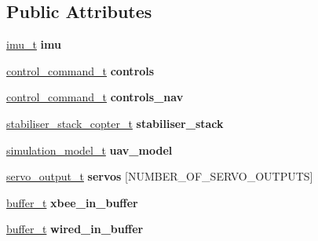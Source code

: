 \subsection*{Public Attributes}
\begin{DoxyCompactItemize}
\item 
\hypertarget{structcentral__data__t_a8092ee2d1d3c812ce85237b29b3e1ffb}{\hyperlink{structimu__t}{imu\+\_\+t} {\bfseries imu}}\label{structcentral__data__t_a8092ee2d1d3c812ce85237b29b3e1ffb}

\item 
\hypertarget{structcentral__data__t_af5e0de4d71e0eb085be0ca35bcb6cd79}{\hyperlink{structcontrol__command__t}{control\+\_\+command\+\_\+t} {\bfseries controls}}\label{structcentral__data__t_af5e0de4d71e0eb085be0ca35bcb6cd79}

\item 
\hypertarget{structcentral__data__t_a87ea6af954a693dd37b6a5c1c50fe762}{\hyperlink{structcontrol__command__t}{control\+\_\+command\+\_\+t} {\bfseries controls\+\_\+nav}}\label{structcentral__data__t_a87ea6af954a693dd37b6a5c1c50fe762}

\item 
\hypertarget{structcentral__data__t_ae4a136cfa00ab1e44db7a3d20a6e0a97}{\hyperlink{structstabiliser__stack__copter__t}{stabiliser\+\_\+stack\+\_\+copter\+\_\+t} {\bfseries stabiliser\+\_\+stack}}\label{structcentral__data__t_ae4a136cfa00ab1e44db7a3d20a6e0a97}

\item 
\hypertarget{structcentral__data__t_ae9253f5ded97bb65cddebc7132bf91f7}{\hyperlink{structsimulation__model__t}{simulation\+\_\+model\+\_\+t} {\bfseries uav\+\_\+model}}\label{structcentral__data__t_ae9253f5ded97bb65cddebc7132bf91f7}

\item 
\hypertarget{structcentral__data__t_a97a4fdc634fbda94296793d50cf96519}{\hyperlink{structservo__output__t}{servo\+\_\+output\+\_\+t} {\bfseries servos} \mbox{[}N\+U\+M\+B\+E\+R\+\_\+\+O\+F\+\_\+\+S\+E\+R\+V\+O\+\_\+\+O\+U\+T\+P\+U\+T\+S\mbox{]}}\label{structcentral__data__t_a97a4fdc634fbda94296793d50cf96519}

\item 
\hypertarget{structcentral__data__t_ad813573894e1abe73e128a57d61305ff}{\hyperlink{structbuffer__t}{buffer\+\_\+t} {\bfseries xbee\+\_\+in\+\_\+buffer}}\label{structcentral__data__t_ad813573894e1abe73e128a57d61305ff}

\item 
\hypertarget{structcentral__data__t_a4b80ee6d357d684045385bfb76cd31b0}{\hyperlink{structbuffer__t}{buffer\+\_\+t} {\bfseries wired\+\_\+in\+\_\+buffer}}\label{structcentral__data__t_a4b80ee6d357d684045385bfb76cd31b0}


\end{DoxyCompactItemize}
